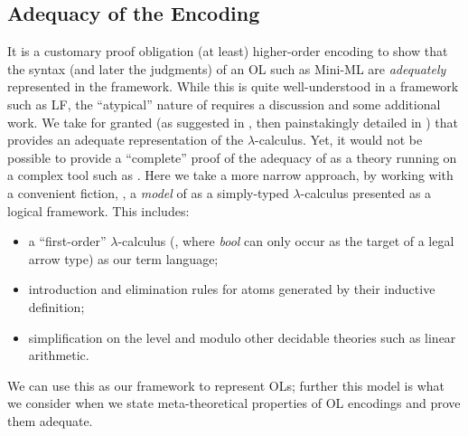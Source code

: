 \documentclass[final]{svjour3}
\begin{document}
\subsection{Adequacy of the Encoding}
\label{ssec:adeq}
It is a customary proof obligation (at least) \wrt higher-order
encoding to show that the syntax (and later the judgments) of an OL
such as Mini-ML are \emph{adequately} represented in the
framework. While this is quite well-understood in a framework such as
LF, the ``atypical'' nature of \hybrid requires a discussion and some
additional work.  We take for granted (as suggested in
\cite{Ambler02}, then painstakingly detailed in \cite{CroleHA})
that \hybrid provides an adequate
representation of the $\lambda$-calculus.
Yet,  it would not be
possible to provide a ``complete'' proof of the adequacy of \hybrid as a
theory running on a complex tool such as \HOL.  Here we take a more
narrow approach, by working with a convenient fiction, \ie, a
\emph{model} of \hybrid as a simply-typed $\lambda$-calculus presented as
a logical framework. This includes:
\begin{itemize}
\item a ``first-order'' $\lambda$-calculus (\ie, where \textit{bool} can
  only occur as the target of a legal arrow type) as our term language;
\item introduction and elimination rules for atoms generated by their
  inductive definition;
\item simplification on the \hybrid level and modulo other decidable theories
  such as linear arithmetic.
\end{itemize}
We can use this as our framework to represent OLs; further this model
is what we consider when we state meta-theoretical properties of OL
encodings and prove them adequate. 
\end{document}
